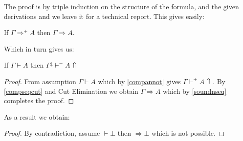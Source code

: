 The proof is by triple induction on the structure of the formula, and the given derivations and we leave it for a technical report. This gives easily:
\begin{theorem}
	If $\Gamma\Rightarrow^{+}A$ then $\Gamma\Rightarrow A$.
	
\end{theorem}
Which in turn gives us:
\begin{theorem}
	\label{normalization}
	If $\Gamma\vdash A$ then $\Gamma^{\downarrow}\vdash^{-} A\Uparrow$
\end{theorem}
\begin{proof}
	From assumption $\Gamma \vdash A$ which by \ref{compannot} gives $\Gamma\vdash^{+} A\Uparrow$. By \ref{compseqcut} and Cut  Elimination we obtain $\Gamma\Rightarrow A$ which by  \ref{soundnseq} completes the proof.
\end{proof}
As a result we obtain:
\begin{proof}
	By contradiction, assume $\vdash\bot$ then $\Rightarrow \bot$ which is not possible.
\end{proof}